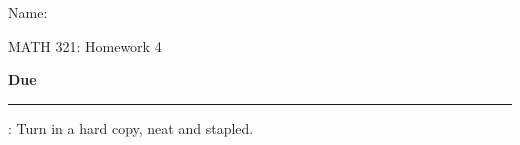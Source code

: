 \documentclass{article}
\newcommand{\blankul}[1]{\rule[-1.5mm]{#1}{0.15mm}}	%
\begin{document}
\hspace{375pt}Name:

\begin{center}
{\Huge MATH 321: Homework 4}
\end{center}

\bigskip\bigskip

{\large \textbf{Due} \blankul{4cm}: Turn in a hard copy, neat and stapled.}\bigskip

\end{document}
